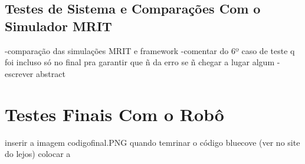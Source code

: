 \subsection{Testes de Sistema e Comparações Com o Simulador MRIT}

-comparação das simulações MRIT e framework
-comentar do 6º caso de teste q foi incluso só no final pra garantir que ñ da erro se ñ chegar a lugar algum
-escrever abstract

\section{Testes Finais Com o Robô}

inserir a imagem codigofinal.PNG quando temrinar o código
bluecove (ver no site do lejos)
colocar a %
